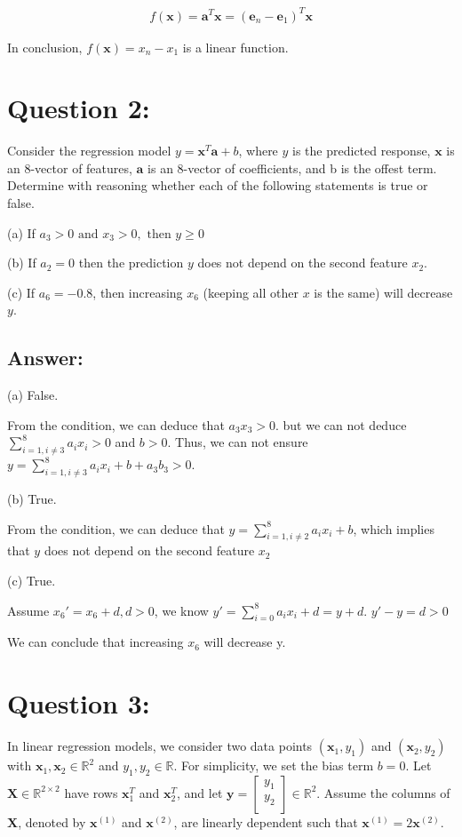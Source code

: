 \documentclass[a4paper,12pt]{article}
\newcommand{\R}{\mathbb{R}}
\begin{document}
\begin{align*}
    f(\bm{x}) = \bm{a}^T\bm{x} = (\bm{e}_n - \bm{e}_1)^T\bm{x}
\end{align*}

In conclusion, \(f(\bm{x}) = x_n - x_1\) is a linear function.

\section*{Question 2:}
Consider the regression model \(y = \bm{x}^T \bm{a} + b\), where \(y\) is the predicted response,
\(\bm{x}\) is an 8-vector of features, \(\bm{a}\) is an 8-vector of coefficients, and b is the offest term.
Determine with reasoning whether each of the following statements is true or false.

(a) If \(a_3 > 0 \text{ and } x_3 > 0, \text{ then } y \geq 0\)

(b) If \(a_2 = 0\) then the prediction \(y\) does not depend on the second feature \(x_2\).

(c) If \(a_6 = -0.8\), then increasing \(x_6\) (keeping all other \(x\) is the same) will decrease \(y\).

\subsection*{Answer:}
(a) False. 

From the condition, we can deduce that \(a_3x_3 > 0\).
but we can not deduce \(\sum_{i = 1, i \neq 3}^{8}a_ix_i > 0\) and \(b > 0\).
Thus, we can not ensure \(y = \sum_{i = 1, i \neq 3}^{8}a_ix_i + b + a_3b_3 > 0\).

(b) True.

From the condition, we can deduce that \(y = \sum_{i = 1, i \neq 2}^{8} a_ix_i + b\),
which implies that \(y\) does not depend on the second feature \(x_2\)

(c) True.

Assume \(x_6' = x_6 + d, d > 0\), we know \(y' = \sum_{i=0}^{8} a_ix_i + d = y + d\).
\(y' - y = d > 0\)

We can conclude that increasing \(x_6\) will decrease y.

\section*{Question 3:}
In linear regression models, we consider two data points \((\bm{x}_1, y_1)\) and \((\bm{x}_2, y_2)\) with \(\bm{x}_1, \bm{x}_2 \in \R^2\)
and \(y_1, y_2 \in \R\). For simplicity, we set the bias term \(b = 0\). Let \(\bm{X} \in \R^{2 \times 2}\) have rows \(\bm{x}_1^T\) and \(\bm{x}_2^T\),
and let \(\bm{y} = \begin{bmatrix}
    y_1 \\
    y_2 \\
\end{bmatrix} \in \R^2\). Assume the columns of \(\bm{X}\), denoted by \(\bm{x}^{(1)}\) and \(\bm{x}^{(2)}\), are linearly dependent such that
\(\bm{x}^{(1)} = 2\bm{x}^{(2)}\).
\end{document}
